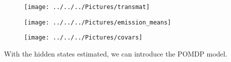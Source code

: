 \documentclass[english]{article}
\numberwithin{equation}{section}
\begin{document}
	\begin{figure}
		\centering
		\texttt{[image: ../../../Pictures/transmat]}
		\caption[State transition matrix]{}
		\label{fig:transmat}
	\end{figure}
	
		\begin{figure}
		\centering
		\texttt{[image: ../../../Pictures/emission\_means]}
		\caption[Emission matrix]{}
		\label{fig:emissionmeans}
	\end{figure}

	\begin{figure}
	\centering
	\texttt{[image: ../../../Pictures/covars]}
	\caption[Emission matrix covariances]{}
	\label{fig:emissioncovars}
	\end{figure}
	
%	
%	
%	
%	
%	
%	
%	
	With the hidden states estimated, we can introduce the POMDP model.
	
\end{document}
